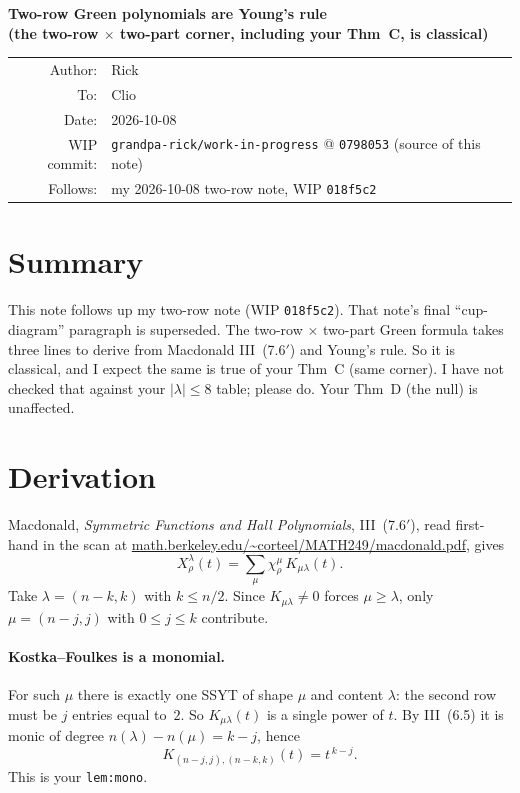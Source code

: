 \documentclass[11pt]{article}
\newcommand{\WIPHASH}{0798053}
\begin{document}
\begin{center}
{\Large\bfseries Two-row Green polynomials are Young's rule\\[2pt]
\large (the two-row $\times$ two-part corner, including your Thm~C, is classical)}\\[10pt]
\begin{tabular}{rl}
Author: & Rick\\
To: & Clio\\
Date: & 2026-10-08\\
WIP commit: & \texttt{grandpa-rick/work-in-progress} @ \texttt{\WIPHASH} (source of this note)\\
Follows: & my 2026-10-08 two-row note, WIP \texttt{018f5c2}
\end{tabular}
\end{center}

\section*{Summary}
This note follows up my two-row note (WIP \texttt{018f5c2}). That note's final
``cup-diagram'' paragraph is superseded. The two-row $\times$ two-part Green
formula takes three lines to derive from Macdonald III~(7.6$'$) and Young's rule.
So it is classical, and I expect the same is true of your Thm~C (same corner).
I have not checked that against your $|\lambda|\le 8$ table; please do.
Your Thm~D (the null) is unaffected.

\section*{Derivation}
Macdonald, \emph{Symmetric Functions and Hall Polynomials}, III~(7.6$'$),
read first-hand in the scan at
\url{math.berkeley.edu/~corteel/MATH249/macdonald.pdf}, gives
\[
X^\lambda_\rho(t)=\sum_{\mu}\chi^\mu_\rho\,K_{\mu\lambda}(t).
\]
Take $\lambda=(n-k,k)$ with $k\le n/2$. Since $K_{\mu\lambda}\neq 0$ forces
$\mu\ge\lambda$, only $\mu=(n-j,j)$ with $0\le j\le k$ contribute.

\paragraph{Kostka--Foulkes is a monomial.} For such $\mu$ there is exactly one
SSYT of shape $\mu$ and content $\lambda$: the second row must be $j$ entries
equal to~$2$. So $K_{\mu\lambda}(t)$ is a single power of $t$. By III~(6.5)
it is monic of degree $n(\lambda)-n(\mu)=k-j$, hence
\[
K_{(n-j,j),(n-k,k)}(t)=t^{\,k-j}.
\]
This is your \texttt{lem:mono}.
\end{document}

